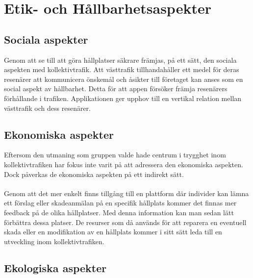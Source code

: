 \documentclass{article}
\begin{document}
\section*{Etik- och Hållbarhetsaspekter}
\subsection*{Sociala aspekter}
Genom att se till att göra hållplatser säkrare främjas, på ett sätt, den sociala aspekten med kollektivtrafik. Att västtrafik tillhandahåller ett medel för deras resenärer att kommunicera önskemål och åsikter till företaget kan anses som en social aspekt av hållbarhet. Detta för att appen försöker främja resenärers förhållande i trafiken. Applikationen ger upphov till en vertikal relation mellan västtrafik och dess resenärer.

\subsection*{Ekonomiska aspekter}
Eftersom den utmaning som gruppen valde hade centrum i trygghet inom kollektivtrafiken har fokus inte varit på att adressera den ekonomiska aspekten. Dock påverkas de ekonomiska aspekten på ett indirekt sätt. 
\\\\
Genom att det mer enkelt finns tillgång till en plattform där individer kan lämna ett förslag eller skadeanmälan på en specifik hållplats kommer det finnas mer feedback på de olika hållplatser. Med denna information kan man sedan lätt förbättra dessa platser. De resurser som då används för att reparera en eventuell skada eller en modifikation av en hållplats kommer i sitt sätt leda till en utveckling inom kollektivtrafiken.
\subsection*{Ekologiska aspekter}
\end{document}
